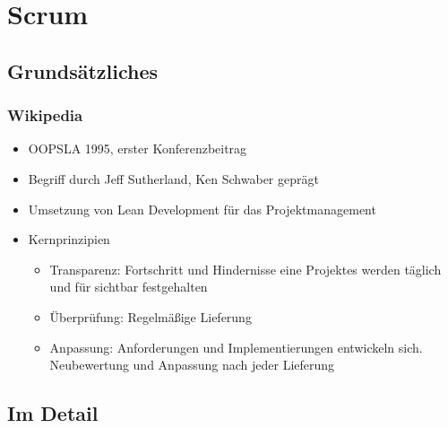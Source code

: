 

\section{Scrum}

\subsection{Grundsätzliches}


\frame
{
  \frametitle{Wikipedia}
  \begin{itemize}
     \item{OOPSLA 1995, erster Konferenzbeitrag}
     \item{Begriff durch Jeff Sutherland, Ken Schwaber geprägt}
     \item{Umsetzung von Lean Development für das Projektmanagement}
     \item{Kernprinzipien
      \begin{itemize}
           \item{Transparenz: Fortschritt und Hindernisse eine Projektes werden täglich und für sichtbar festgehalten}
           \item{Überprüfung: Regelmäßige Lieferung}
           \item{Anpassung: Anforderungen und Implementierungen entwickeln sich. Neubewertung und Anpassung nach jeder Lieferung}
      \end{itemize}
     }
  \end{itemize}
}


\subsection{Im Detail}



